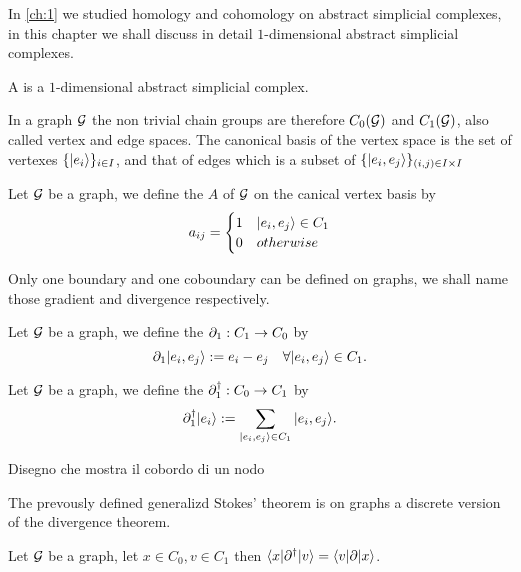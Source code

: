\documentclass[../2.tex]{subfiles}
\begin{document}
    In \autoref{ch:1} we studied homology and cohomology on abstract simplicial complexes, in this chapter we shall discuss in detail
    $1$-dimensional abstract simplicial complexes.

    \begin{defn}
        A  is a $1$-dimensional abstract simplicial complex.
    \end{defn}

    In a graph $\mathcal{G}$ the non trivial chain groups are therefore $C_0(\mathcal{G})$ and $C_1(\mathcal{G})$, also called vertex and edge spaces. 
    The canonical basis of the vertex space is the set of vertexes $\{| e_i \rangle\}_{i \in I}$, and that of edges which is a subset of $\{| e_i,e_j \rangle\}_{(i,j)\in I\times I}$

    \begin{defn}
        Let $\mathcal{G}$ be a graph, we define the  $A$ of $\mathcal{G}$ on the canical vertex basis by
        \[a_{ij} = 
        \begin{cases}
            1 & | e_i,e_j \rangle \in C_1 \\
            0 & otherwise \\
        \end{cases} \]        
    \end{defn}
    Only one boundary and one coboundary can be defined on graphs, we shall name those gradient and divergence respectively.

    \begin{defn}
        Let $\mathcal{G}$ be a graph, we define the  $\partial_1 : C_1 \to C_0$ by 
        \[ \partial_1| e_i,e_j \rangle := e_i - e_j \quad \forall | e_i,e_j \rangle \in C_1.\]
    \end{defn}
    
    \begin{defn}
        Let $\mathcal{G}$ be a graph, we define the  $\partial^\dagger_1 : C_0 \to C_1$ by 
        \[ \partial^\dagger_1| e_i \rangle := \sum_{| e_i,e_j \rangle \in C_1} | e_i,e_j \rangle.\]
    \end{defn}

    {\color{red} Disegno che mostra il cobordo di un nodo}

    The prevously defined generalizd Stokes' theorem is on graphs a discrete version of the divergence theorem.

    \begin{thm}
        Let $\mathcal{G}$ be a graph, let $x \in C_0, v \in C_1$ then $\langle x |\partial^\dagger| v \rangle = \langle v |\partial| x \rangle$.
    \end{thm}
\end{document}
